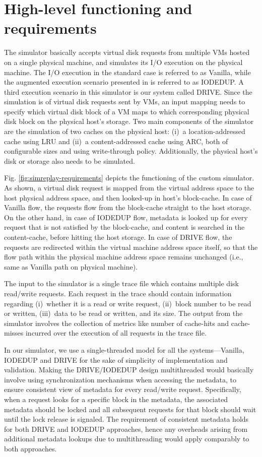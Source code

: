 \section{High-level functioning and requirements}
The simulator basically accepts virtual disk requests from multiple VMs
hosted on a single physical machine, and simulates its I/O execution
on the physical machine. The I/O execution in the standard case is referred 
to as Vanilla, while the augmented execution scenario presented
in \cite{iodedup} is referred to as IODEDUP. A third execution 
scenario in this simulator is our system called DRIVE.
Since the simulation is of virtual disk requests sent by VMs, an input 
mapping needs to specify which virtual disk block of a VM maps to which
corresponding physical disk block on the physical host's storage.
Two main components of the simulator are the simulation of two 
caches on the physical host: 
(i)~a location-addressed cache using LRU and 
(ii)~a content-addressed cache using ARC, both
of configurable sizes and using write-through policy. 
Additionally, the physical host's disk or storage also needs to be simulated. 

Fig. \ref{fig:simreplay-requirements} depicts the functioning 
of the custom simulator.
As shown, a virtual disk request is mapped from the virtual address space to
the host physical address space, and then looked-up in host's block-cache.
In case of Vanilla flow, the requests flow from the block-cache straight
to the host storage. On the other hand, in case of IODEDUP flow, 
metadata is looked up for every request that is not satisfied by the
block-cache, and content is searched in the content-cache, before hitting
the host storage. In case of DRIVE flow, the requests are redirected
within the virtual machine address space itself, so that the flow path
within the physical machine address space remains unchanged (i.e., same
as Vanilla path on physical machine).

The input to the simulator is a single trace file which contains multiple
disk read/write requests. 
Each request in the trace should contain information regarding
(i)~whether it is a read or write request,
(ii)~block number to be read or written,
(iii)~data to be read or written, and its size.
The output from the simulator involves the collection of metrics like
number of cache-hits and cache-misses incurred over the execution of
all requests in the trace file.

In our simulator, we use a single-threaded model for all the
systems---Vanilla, IODEDUP and DRIVE for the sake of simplicity of
implementation and validation. Making the DRIVE/IODEDUP design
multithreaded would basically involve using synchronization mechanisms
when accessing the metadata, to ensure consistent view of metadata
for every read/write request. Specifically, when a request looks for
a specific block in the metadata, the associated metadata should be
locked and all subsequent requests for that block should wait until
the lock release is signaled. The requirement of consistent metadata
holds for both DRIVE and IODEDUP approaches, hence any overheads
arising from additional metadata lookups due to multithreading
would apply comparably to both approaches.

